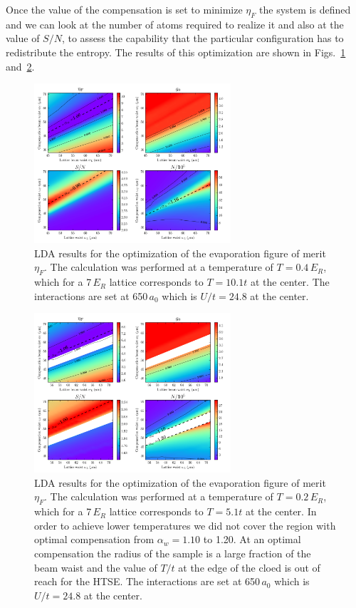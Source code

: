 \documentclass[11pt,letter]{article}
\newcommand{\awaist}{\ensuremath{ \alpha_{w} }}
\begin{document}
Once the value of the compensation is set to minimize $\eta_{F}$ the system is
defined and we can look at the number of atoms required to realize it and also
at the value of $S/N$, to assess the capability that the particular
configuration has to redistribute the entropy.   The results of this
optimization are shown in Figs.~\ref{fig:optimize_etaF}
and~\ref{fig:optimize_etaF_cold}.
\begin{figure}
    \centering
\includegraphics[width=0.65\textwidth]{figures_hubbard-lda/etaF-wIRwGR.png}
\caption{LDA results for the optimization of the evaporation figure of merit
$\eta_{F}$. The calculation was performed at a temperature of $T=0.4\,E_{R}$,
which for a 7\,$E_{R}$ lattice corresponds to $T=10.1t$ at the center.  The
interactions are set at 650\,$a_{0}$ which is $U/t=24.8$ at the center. }
    \label{fig:optimize_etaF}
\end{figure}

\begin{figure}
    \centering
\includegraphics[width=0.65\textwidth]{figures_hubbard-lda/etaF-wIRwGR_cold.png}
\caption{LDA results for the optimization of the evaporation figure of merit
$\eta_{F}$. The calculation was performed at a temperature of $T=0.2\,E_{R}$,
which for a 7\,$E_{R}$ lattice corresponds to $T=5.1t$ at the center. In order
to achieve lower temperatures we did not cover the region with optimal
compensation from $\awaist=1.10$ to 1.20.   At an optimal compensation the
radius of the sample is a large fraction of the beam waist and the value of
$T/t$ at the edge of the cloed is out of reach for the HTSE.  The interactions
are set at 650\,$a_{0}$ which is $U/t=24.8$ at the center. }
    \label{fig:optimize_etaF_cold}
\end{figure}
\end{document}
